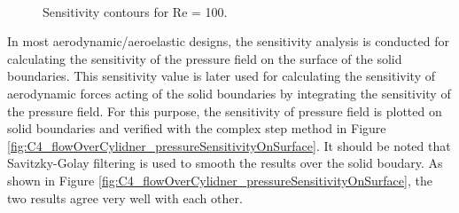 \begin{figure}[H]
    \centering
    \quad
    \\
    \caption{Sensitivity contours for Re = 100.}
    \label{fig:C4_flowOverCylinderSensitivityContour}
\end{figure}

In most aerodynamic/aeroelastic designs, the sensitivity analysis is conducted for calculating the sensitivity of the pressure field on the surface of the solid boundaries. This sensitivity value is later used for calculating the sensitivity of aerodynamic forces acting of the solid boundaries by integrating the sensitivity of the pressure field. For this purpose, the sensitivity of pressure field is plotted on solid boundaries and verified with the complex step method in Figure \ref{fig:C4_flowOverCylidner_pressureSensitivityOnSurface}. It should be noted that Savitzky-Golay filtering is used to smooth the results over the solid boudary. As shown in Figure \ref{fig:C4_flowOverCylidner_pressureSensitivityOnSurface}, the two results agree very well with each other.


